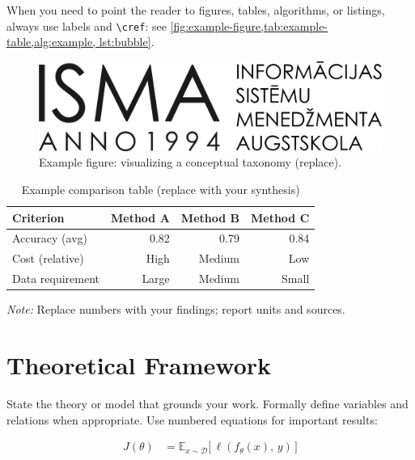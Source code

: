 When you need to point the reader to figures, tables, algorithms, or listings, always use labels and \verb|\cref|:
see \cref{fig:example-figure,tab:example-table,alg:example, lst:bubble}.

\begin{figure}[h]
  \centering
  \includegraphics[width=0.7\linewidth]{b_chapters/chapter1/assets/isma_logo.png}
  \caption{Example figure: visualizing a conceptual taxonomy (replace).}
  \label{fig:example-figure}
\end{figure}

{\singlespacing
\begin{table}[h]
  \caption{Example comparison table (replace with your synthesis)}
  \label{tab:example-table}
  \centering
  \begin{tabular}{lrrr}
    \toprule
    Criterion            & Method A & Method B & Method C\\
    \midrule
    Accuracy (avg)       & 0.82     & 0.79     & 0.84\\
    Cost (relative)      & High     & Medium   & Low\\
    Data requirement     & Large    & Medium   & Small\\
    \bottomrule
  \end{tabular}

  \vspace{2mm}
  \emph{Note:} Replace numbers with your findings; report units and sources.
\end{table}
}

\section{Theoretical Framework}
\label{sec:theory}
State the theory or model that grounds your work. Formally define variables and relations when appropriate. Use numbered equations for important results:

\begin{align}
  \label{eq:objective}
  J(\theta) &= \mathbb{E}_{x \sim \mathcal{D}} \bigl[\, \ell(f_\theta(x),\, y)\, \bigr]
\end{align}

